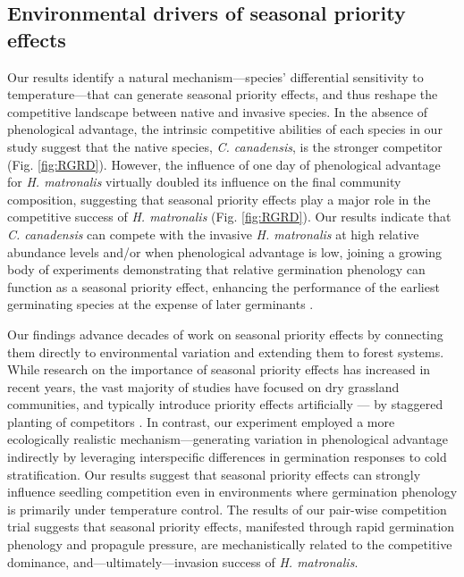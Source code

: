 \documentclass{article}[11pt]
\begin{document}
\subsection*{Environmental drivers of seasonal priority effects} 
Our results identify a natural mechanism---species' differential sensitivity to temperature---that can generate seasonal priority effects, and thus reshape the competitive landscape between native and invasive species. In the absence of phenological advantage, the intrinsic competitive abilities of each species in our study suggest that the native species, \textit{C. canadensis}, is the stronger competitor (Fig. \ref{fig:RGRD}). %
However, the influence of one day of phenological advantage for \textit{H. matronalis} virtually doubled its influence on the final community composition, suggesting that seasonal priority effects play a major role in the competitive success of \textit{H. matronalis} (Fig. \ref{fig:RGRD}). Our results indicate that \textit{C. canadensis} can compete with the invasive \textit{H. matronalis} at high relative abundance levels and/or when phenological advantage is low, joining a growing body of experiments demonstrating that relative germination phenology can function as a seasonal priority effect, enhancing the performance of the earliest germinating species at the expense of later germinants \citep{Korner2008,Dickson2012,Ross1972}.

Our findings advance decades of work on seasonal priority effects by connecting them directly to environmental variation and extending them to forest systems. While research on the importance of seasonal priority effects has increased in recent years, the vast majority of studies have focused on dry grassland communities, and typically introduce priority effects artificially --- by staggered planting of competitors \citep{Young:2017aa,Weidlich:2020aa}. In contrast, our experiment employed a more ecologically realistic mechanism---generating variation in phenological advantage indirectly by leveraging interspecific differences in germination responses to cold stratification. Our results suggest that seasonal priority effects can strongly influence seedling competition even in environments where germination phenology is primarily under temperature control. The results of our pair-wise competition trial suggests that seasonal priority effects, manifested through rapid germination phenology and propagule pressure, are mechanistically related to the competitive dominance, and---ultimately---invasion success of \textit{H. matronalis}. 
\end{document}

